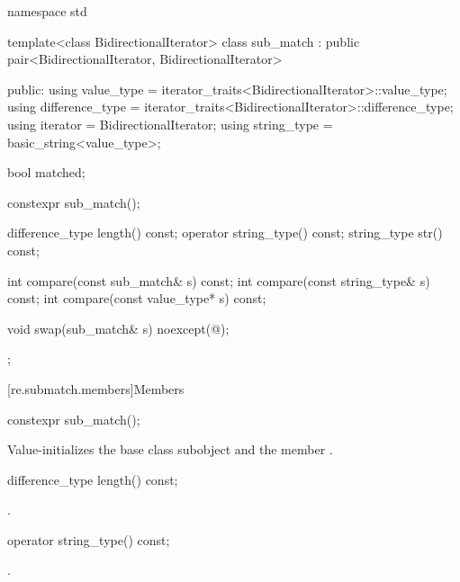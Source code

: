 \begin{codeblock}
namespace std {
  template<class BidirectionalIterator>
    class sub_match : public pair<BidirectionalIterator, BidirectionalIterator> {
    public:
      using value_type      = iterator_traits<BidirectionalIterator>::value_type;
      using difference_type = iterator_traits<BidirectionalIterator>::difference_type;
      using iterator        = BidirectionalIterator;
      using string_type     = basic_string<value_type>;

      bool matched;

      constexpr sub_match();

      difference_type length() const;
      operator string_type() const;
      string_type str() const;

      int compare(const sub_match& s) const;
      int compare(const string_type& s) const;
      int compare(const value_type* s) const;

      void swap(sub_match& s) noexcept(@\seebelow@);
    };
}
\end{codeblock}


[re.submatch.members]{Members}

%
\begin{itemdecl}
constexpr sub_match();
\end{itemdecl}

\begin{itemdescr}
\pnum
\effects
Value-initializes the  base class subobject and the member
.
\end{itemdescr}

%
\begin{itemdecl}
difference_type length() const;
\end{itemdecl}

\begin{itemdescr}
\pnum
\returns
{}.
\end{itemdescr}

%
\begin{itemdecl}
operator string_type() const;
\end{itemdecl}

\begin{itemdescr}
\pnum
\returns
{}.
\end{itemdescr}


